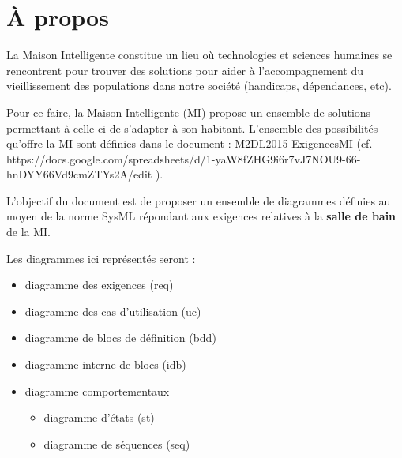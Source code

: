 \chapter{À propos}
La Maison Intelligente constitue un lieu où technologies et sciences humaines se rencontrent pour trouver des solutions pour aider à l'accompagnement du vieillissement des populations dans notre société (handicaps, dépendances, etc).
 
Pour ce faire, la Maison Intelligente (MI) propose un ensemble de solutions permettant à celle-ci de s'adapter à son habitant.  L'ensemble des possibilités qu'offre la MI sont définies dans le document : M2DL2015-ExigencesMI (cf. https://docs.google.com/spreadsheets/d/1-yaW8fZHG9i6r7vJ7NOU9-66-hnDYY66Vd9cmZTYs2A/edit ). 

L'objectif du document est de proposer un ensemble de diagrammes définies au moyen de la norme SysML répondant aux exigences relatives à la \textbf{salle de bain} de la MI.

Les diagrammes ici représentés seront :
\begin{itemize}
	\item diagramme des exigences (req)
	\item diagramme des cas d'utilisation (uc)
	\item diagramme de blocs de définition (bdd)
	\item diagramme interne de blocs (idb)
	\item diagramme comportementaux
	\begin{itemize}
		\item diagramme d'états (st)
		\item diagramme de séquences (seq)
	\end{itemize}
\end{itemize} 